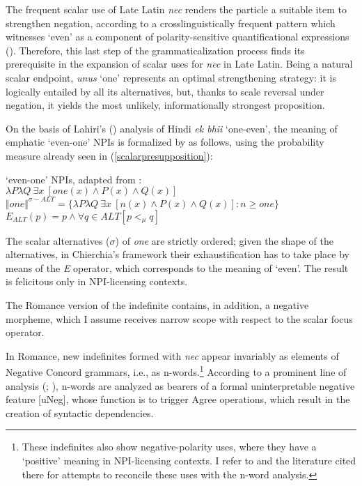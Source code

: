 \documentclass[output=paper,modfonts,nonflat,citecolor=brown,
showindex
]{langsci/langscibook}
\begin{document}
The frequent scalar use of Late Latin {\emph{nec}} renders the particle a suitable item to strengthen negation, according to a crosslinguistically frequent pattern which witnesses `even' as a component of polarity-sensitive quantificational expressions (\citealt[]{Haspelmath97, Lahiri98, Watanabe04, Chierchia13}). Therefore, this last step of the grammaticalization process finds its prerequisite in the expansion of scalar uses for {\emph{nec}} in Late Latin. Being a natural scalar endpoint, {\emph{unus}} `one' represents an optimal strengthening strategy: it is logically entailed by all its alternatives, but, thanks to scale reversal under negation, it yields the most unlikely, informationally strongest proposition. 

On the basis of Lahiri's (\citeyear{Lahiri98}) analysis of Hindi {\emph{ek bhii}} `one-even', the meaning of emphatic `even-one' NPIs is formalized by \citet[156]{Chierchia13} as follows, using the probability measure already seen in (\ref{scalarpresupposition}):

{\begin{exe}
\ex
\begin{xlist}
\ex \label{evenoneNPIChierchia} `even-one' NPIs, adapted from \citet[156]{Chierchia13}:\\ 
$\lambda P \lambda Q \ \exists x \ [one(x) \wedge P(x) \wedge Q(x) ]$\\
$\Vert one \Vert^{\sigma-ALT} = \{ \lambda P \lambda Q \ \exists x \ [n(x) \wedge P(x) \wedge Q(x)]: n \geq one \}$
\ex $ E_{ALT}(p) = p \wedge \forall q \in ALT [p <_{\mu} q]$
\end{xlist}
\end{exe}}

\noindent The scalar alternatives ($\sigma$) of {\emph{one}} are strictly ordered; given the shape of the alternatives, in Chierchia's framework their exhaustification has to take place by means of the {\emph{E}} operator, which corresponds to the meaning of `even'. The result is felicitous only in NPI-licensing contexts.

The Romance version of the indefinite contains, in addition, a negative morpheme, which I assume receives narrow scope with respect to the scalar focus operator.

In Romance, new indefinites formed with {\emph{nec}} appear invariably as elements of Negative Concord grammars, i.e., as n-words.{\footnote{These indefinites also show negative-polarity uses, where they have a `positive' meaning in NPI-licensing contexts. I refer to \citet[chapter 5]{Gianollo18} and the literature cited there for attempts to reconcile these uses with the n-word analysis.}} 
According to a prominent line of analysis (\citealt[]{Zeijlstra04, Zeijlstra14}; \citealt[]{Penka11}), n-words are analyzed as bearers of a formal uninterpretable negative feature [uNeg], whose function is to trigger Agree operations, which result in the creation of syntactic dependencies. 
\end{document}
